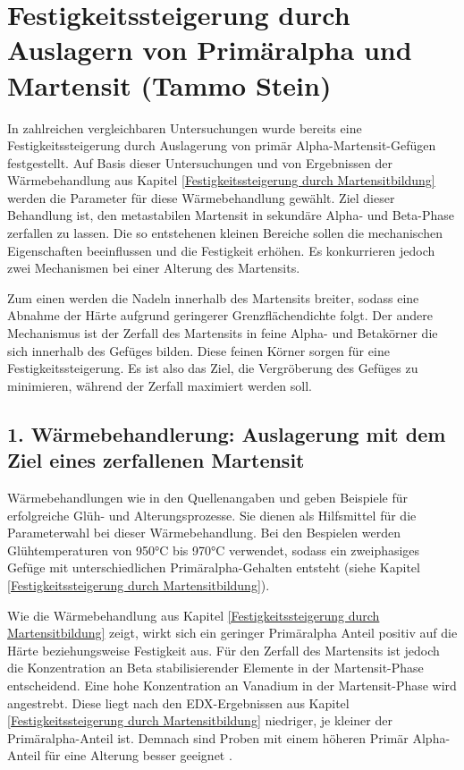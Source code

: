 \documentclass[a4paper, 11pt]{tubsreprt}
\begin{document}
\newpage


\section{Festigkeitssteigerung durch Auslagern von Primäralpha und Martensit (Tammo Stein)}\label{Primäralpha und martensit}
In zahlreichen vergleichbaren Untersuchungen wurde bereits eine Festigkeitssteigerung durch Auslagerung von primär Alpha-Martensit-Gefügen festgestellt. Auf Basis dieser Untersuchungen und von Ergebnissen der Wärmebehandlung aus Kapitel \ref{Festigkeitssteigerung durch Martensitbildung} werden die Parameter für diese Wärmebehandlung gewählt. Ziel dieser Behandlung ist, den metastabilen Martensit in sekundäre Alpha- und Beta-Phase zerfallen zu lassen. Die so entstehenen kleinen Bereiche sollen die mechanischen Eigenschaften beeinflussen und die Festigkeit erhöhen\cite{Gilbert2004}. Es konkurrieren jedoch zwei Mechanismen bei einer Alterung des Martensits. 

Zum einen werden die Nadeln innerhalb des Martensits breiter, sodass eine Abnahme der Härte aufgrund geringerer Grenzflächendichte folgt. Der andere Mechanismus ist der Zerfall des Martensits in feine Alpha- und Betakörner die sich innerhalb des Gefüges bilden. Diese feinen Körner sorgen für eine Festigkeitssteigerung. Es ist also das Ziel, die Vergröberung des Gefüges zu minimieren, während der Zerfall maximiert werden soll. 
\subsection{1. Wärmebehandlerung: Auslagerung mit dem Ziel eines zerfallenen Martensit}
Wärmebehandlungen wie in den Quellenangaben \cite{Gilbert2004} und \cite{Chen2008} geben Beispiele für erfolgreiche Glüh- und Alterungsprozesse. Sie dienen als Hilfsmittel für die Parameterwahl bei dieser Wärmebehandlung. Bei den Bespielen werden Glühtemperaturen von 950°C bis 970°C verwendet, sodass ein zweiphasiges Gefüge mit unterschiedlichen Primäralpha-Gehalten entsteht (siehe Kapitel \ref{Festigkeitssteigerung durch Martensitbildung}). 

Wie die Wärmebehandlung aus Kapitel \ref{Festigkeitssteigerung durch Martensitbildung} zeigt, wirkt sich ein geringer Primäralpha Anteil positiv auf die Härte beziehungsweise Festigkeit aus. Für den Zerfall des Martensits ist jedoch die Konzentration an Beta stabilisierender Elemente in der Martensit-Phase entscheidend. Eine hohe Konzentration an Vanadium in der Martensit-Phase wird angestrebt. Diese liegt nach den EDX-Ergebnissen aus Kapitel \ref{Festigkeitssteigerung durch Martensitbildung} niedriger, je kleiner der Primäralpha-Anteil ist. Demnach sind Proben mit einem höheren Primär Alpha-Anteil für eine Alterung besser geeignet \cite{Luetjering2007}.
\end{document}
